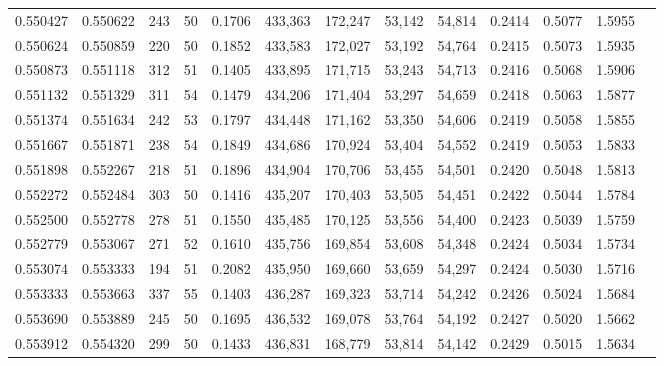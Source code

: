 \begin{tabular}{rrrrrrrrrrrrr}
0.550427 & 0.550622 &    243 &    50 &                                     0.1706 & 433,363 & 172,247 &  53,142 &  54,814 & 0.2414 & 0.5077 & 1.5955 \\
0.550624 & 0.550859 &    220 &    50 &                                     0.1852 & 433,583 & 172,027 &  53,192 &  54,764 & 0.2415 & 0.5073 & 1.5935 \\
0.550873 & 0.551118 &    312 &    51 &                                     0.1405 & 433,895 & 171,715 &  53,243 &  54,713 & 0.2416 & 0.5068 & 1.5906 \\
0.551132 & 0.551329 &    311 &    54 &                                     0.1479 & 434,206 & 171,404 &  53,297 &  54,659 & 0.2418 & 0.5063 & 1.5877 \\
0.551374 & 0.551634 &    242 &    53 &                                     0.1797 & 434,448 & 171,162 &  53,350 &  54,606 & 0.2419 & 0.5058 & 1.5855 \\
0.551667 & 0.551871 &    238 &    54 &                                     0.1849 & 434,686 & 170,924 &  53,404 &  54,552 & 0.2419 & 0.5053 & 1.5833 \\
0.551898 & 0.552267 &    218 &    51 &                                     0.1896 & 434,904 & 170,706 &  53,455 &  54,501 & 0.2420 & 0.5048 & 1.5813 \\
0.552272 & 0.552484 &    303 &    50 &                                     0.1416 & 435,207 & 170,403 &  53,505 &  54,451 & 0.2422 & 0.5044 & 1.5784 \\
0.552500 & 0.552778 &    278 &    51 &                                     0.1550 & 435,485 & 170,125 &  53,556 &  54,400 & 0.2423 & 0.5039 & 1.5759 \\
0.552779 & 0.553067 &    271 &    52 &                                     0.1610 & 435,756 & 169,854 &  53,608 &  54,348 & 0.2424 & 0.5034 & 1.5734 \\
0.553074 & 0.553333 &    194 &    51 &                                     0.2082 & 435,950 & 169,660 &  53,659 &  54,297 & 0.2424 & 0.5030 & 1.5716 \\
0.553333 & 0.553663 &    337 &    55 &                                     0.1403 & 436,287 & 169,323 &  53,714 &  54,242 & 0.2426 & 0.5024 & 1.5684 \\
0.553690 & 0.553889 &    245 &    50 &                                     0.1695 & 436,532 & 169,078 &  53,764 &  54,192 & 0.2427 & 0.5020 & 1.5662 \\
0.553912 & 0.554320 &    299 &    50 &                                     0.1433 & 436,831 & 168,779 &  53,814 &  54,142 & 0.2429 & 0.5015 & 1.5634 \\

\end{tabular}
